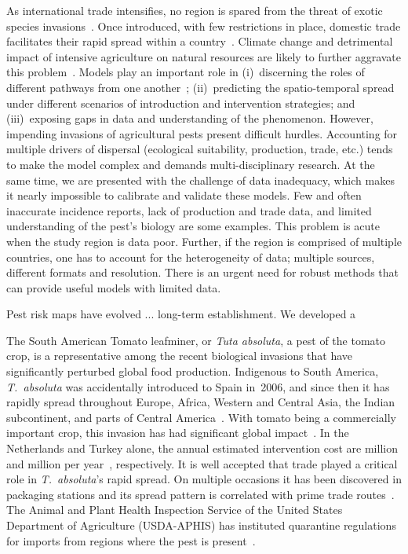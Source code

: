\documentclass[11pt]{article}
\newcommand{\tuta}{\emph{T.~absoluta}}
\theoremstyle{definition}
\begin{document}
As international trade intensifies, no region is spared from the threat of
exotic species invasions~\cite{hulme2009trade}. Once introduced, with few
restrictions in place, domestic trade facilitates their rapid spread within
a country~\cite{}. Climate change and detrimental impact of intensive
agriculture on natural resources are likely to further aggravate this
problem~\cite{early2016global}.  Models play an important role in
(i)~discerning the roles of different pathways from one
another~\cite{13challenges}; (ii)~predicting the spatio-temporal spread
under different scenarios of introduction and intervention strategies; and
(iii)~exposing gaps in data and understanding of the phenomenon. However,
impending invasions of agricultural pests present difficult hurdles.
Accounting for multiple drivers of dispersal (ecological suitability,
production, trade, etc.) tends to make the model complex and demands
multi-disciplinary research. At the same time, we are presented with the
challenge of data inadequacy, which makes it nearly impossible to calibrate
and validate these models. Few and often inaccurate incidence reports, lack
of production and trade data, and limited understanding of the pest's
biology are some examples. This problem is acute when the study region is
data poor. Further, if the region is comprised of multiple countries, one
has to account for the heterogeneity of data; multiple sources, different
formats and resolution. There is an urgent need for robust methods that can
provide useful models with limited data.

Pest risk maps have evolved ... long-term establishment. 
 We developed a 


The South American Tomato leafminer, or \emph{Tuta absoluta}, a pest of the
tomato crop, is a representative among the recent biological invasions that
have significantly perturbed global food production. Indigenous to South
America, \tuta{} was accidentally introduced to Spain in~2006, and since
then it has rapidly spread throughout Europe, Africa, Western and Central
Asia, the Indian subcontinent, and parts of Central
America~\cite{desneux2010biological,biondi2017}. With tomato being a
commercially important crop, this invasion has had significant global
impact~\cite{campos2017western}. In the Netherlands and Turkey alone, the
annual estimated intervention cost are  million and 
million per year~\cite{}, respectively. It is well accepted that trade
played a critical role in \tuta{}'s rapid spread. On multiple occasions it
has been discovered in packaging stations and its spread pattern is
correlated with prime trade routes~\cite{karadjova2013tuta}. The Animal and
Plant Health Inspection Service of the United States Department of
Agriculture (USDA-APHIS) has instituted quarantine regulations for imports
from regions where the pest is present~\cite{USDA2012}.
\end{document}

